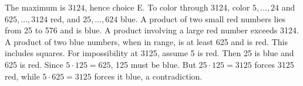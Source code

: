 The maximum is $\boxed{3124}$, hence choice E. To color through 3124, color $5,\ldots,24$ and $625,\ldots,3124$ red, and $25,\ldots,624$ blue. A product of two small red numbers lies from 25 to 576 and is blue. A product involving a large red number exceeds 3124. A product of two blue numbers, when in range, is at least 625 and is red. This includes squares. For impossibility at 3125, assume 5 is red. Then 25 is blue and 625 is red. Since $5\cdot125=625$, 125 must be blue. But $25\cdot125=3125$ forces 3125 red, while $5\cdot625=3125$ forces it blue, a contradiction.
